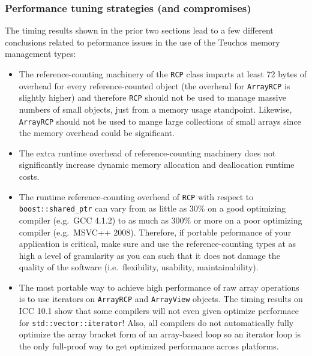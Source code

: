 \documentclass[pdf,ps2pdf,11pt]{SANDreport}
\begin{document}
%
{}\subsubsection{Performance tuning strategies (and compromises)}
\label{sec:perf-tuning-strategies}
%

The timing results shown in the prior two sections lead to a few
different conclusions related to peformance issues in the use of the
Teuchos memory management types:

\begin{itemize}

{}\item The reference-counting machinery of the {}\texttt{RCP} class
imparts at least 72 bytes of overhead for every reference-counted
object (the overhead for {}\texttt{ArrayRCP} is slightly higher) and
therefore {}\texttt{RCP} should not be used to manage massive numbers
of small objects, just from a memory usage standpoint.  Likewise,
{}\texttt{ArrayRCP} should not be used to mange large collections of
small arrays since the memory overhead could be significant.

{}\item The extra runtime overhead of reference-counting machinery
does not significantly increase dynamic memory allocation and
deallocation runtime costs.

{}\item The runtime reference-counting overhead of {}\texttt{RCP} with
respect to {}\texttt{boost::shared\_ptr} can vary from as little as
30\% on a good optimizing compiler (e.g.\ GCC 4.1.2) to as much as
300\% or more on a poor optimizing compiler (e.g.\ MSVC++ 2008).
Therefore, if portable peformance of your application is critical,
make sure and use the reference-counting types at as high a level of
granularity as you can such that it does not damage the quality of the
software (i.e.\ flexibility, usability, maintainability).

{}\item The most portable way to achieve high performance of raw array
operations is to use iterators on {}\texttt{ArrayRCP} and
{}\texttt{ArrayView} objects.  The timing results on ICC 10.1 show
that some compilers will not even given optimize performace for
{}\texttt{std::vector::iterator}!  Also, all compilers do not
automatically fully optimize the array bracket form of an array-based
loop so an iterator loop is the only full-proof way to get optimized
performance across platforms.

\end{itemize}
\end{document}
